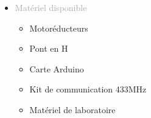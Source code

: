 \documentclass{article}
\renewcommand{\headrulewidth}{0pt} %
\renewcommand{\headrulewidth}{1pt} %
\renewcommand{\headrule}{\color{mainBlue}\hrule width\headwidth height\headrulewidth \vskip-\headrulewidth} %
\begin{document}
\begin{tabular}
\begin{itemize}
\begin{itemize}
        \end{itemize}
        \item \textcolor{darkGray}{Matériel disponible}
        \begin{itemize}
            [label={\textcolor{gray!100}{\checkmark}}, topsep=8pt, partopsep=0pt, itemsep=0.5pt, parsep=2pt,after=\vspace*{-\baselineskip}] 
            \item \textcolor{gray!100}{Motoréducteurs}
            \item \textcolor{gray!100}{Pont en H}
            \item \textcolor{gray!100}{Carte Arduino}
            \item \textcolor{gray!100}{Kit de communication 433MHz}
            \item \textcolor{gray!100}{Matériel de laboratoire}
        \end{itemize}
    \end{itemize}
\end{tabular}

\vfill %






\newpage


{
    \fancyhf{} 
    \fancyhead[L] %
    {
        \vspace*{10pt} %
        \textcolor{darkGray}{Dossier de compétences } 
    } 
    \fancyfoot[C]{\thepage\ / \pageref{LastPage}} %
    \renewcommand{\headrulewidth}{2pt} %
    \renewcommand{\headrule}{\color{mainBlue}\hrule width\headwidth height\headrulewidth \vskip-\headrulewidth} %
}
\end{document}

